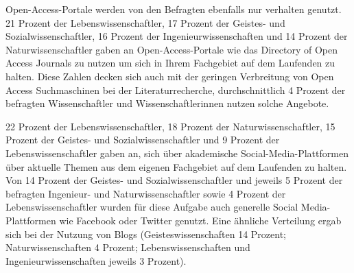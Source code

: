 Open-Access-Portale werden von den Befragten ebenfalls nur verhalten genutzt. 21 Prozent der Lebenswissenschaftler, 17 Prozent der Geistes- und Sozialwissenschaftler, 16 Prozent der Ingenieurwissenschaften und 14 Prozent der Naturwissenschaftler gaben an Open-Access-Portale wie das Directory of Open Access Journals zu nutzen um sich in Ihrem Fachgebiet auf dem Laufenden zu halten. Diese Zahlen decken sich auch mit der geringen Verbreitung von Open Access Suchmaschinen bei der Literaturrecherche, durchschnittlich 4 Prozent der befragten Wissenschaftler und Wissenschaftlerinnen nutzen solche Angebote.

22 Prozent der Lebenswissenschaftler, 18 Prozent der Naturwissenschaftler, 15 Prozent der Geistes- und Sozialwissenschaftler und 9 Prozent der Lebenswissenschaftler gaben an, sich über akademische Social-Media-Plattformen über aktuelle Themen aus dem eigenen Fachgebiet auf dem Laufenden zu halten. Von 14 Prozent der Geistes- und Sozialwissenschaftler und jeweils 5 Prozent der befragten Ingenieur- und Naturwissenschaftler sowie 4 Prozent der Lebenswissenschaftler wurden für diese Aufgabe auch generelle Social Media-Plattformen wie Facebook oder Twitter genutzt. Eine ähnliche Verteilung ergab sich bei der Nutzung von Blogs (Geisteswissenschaften 14 Prozent; Naturwissenschaften 4 Prozent; Lebenswissenschaften und Ingenieurwissenschaften jeweils 3 Prozent).

